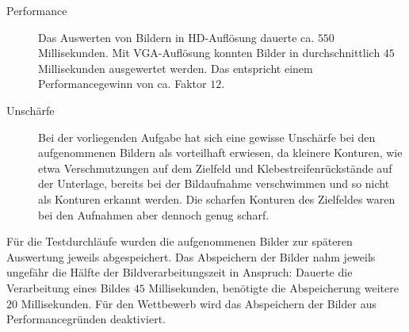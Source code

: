 \begin{description}
    \item[Performance] Das Auswerten von Bildern in HD-Auflösung dauerte ca. $550$ Millisekunden. Mit VGA-Auflösung konnten Bilder in durchschnittlich $45$ Millisekunden ausgewertet werden. Das entspricht einem Performancegewinn von ca. Faktor $12$.
    \item[Unschärfe] Bei der vorliegenden Aufgabe hat sich eine gewisse Unschärfe bei den aufgenommenen Bildern als vorteilhaft erwiesen, da kleinere Konturen, wie etwa Verschmutzungen auf dem Zielfeld und Klebestreifenrückstände auf der Unterlage, bereits bei der Bildaufnahme verschwimmen und so nicht als Konturen erkannt werden. Die scharfen Konturen des Zielfeldes waren bei den Aufnahmen aber dennoch genug scharf.
\end{description}

Für die Testdurchläufe wurden die aufgenommenen Bilder zur späteren Auswertung jeweils abgespeichert. Das Abspeichern der Bilder nahm jeweils ungefähr die Hälfte der Bildverarbeitungszeit in Anspruch: Dauerte die Verarbeitung eines Bildes $45$ Millisekunden, benötigte die Abspeicherung weitere $20$ Millisekunden. Für den Wettbewerb wird das Abspeichern der Bilder aus Performancegründen deaktiviert.
